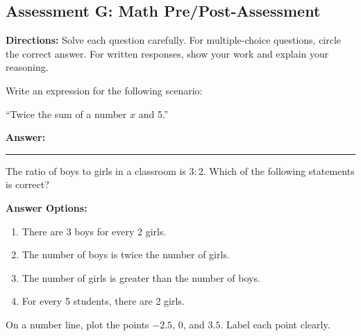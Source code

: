 \documentclass[12pt]{article}
\begin{document}
\subsection*{Assessment G: Math Pre/Post-Assessment}
\onehalfspacing

\begin{tcolorbox}[colframe=black!50, colback=white, title=Assessment Directions]
\textbf{Directions:} Solve each question carefully. For multiple-choice questions, circle the correct answer. For written responses, show your work and explain your reasoning.
\end{tcolorbox}

\begin{tcolorbox}[colframe=black!50, colback=white, title=\textbf{Problem 1 (6.EE.A.2)}]
Write an expression for the following scenario: 

``Twice the sum of a number \(x\) and 5.'' 

\vspace{2cm}
\textbf{Answer:} \rule{0.5\textwidth}{0.4mm}
\end{tcolorbox}

\begin{tcolorbox}[colframe=black!50, colback=white, title=\textbf{Problem 2 (6.RP.A.1)}]
The ratio of boys to girls in a classroom is \(3:2\). Which of the following statements is correct?

\textbf{Answer Options:}
\begin{enumerate}[label=(\Alph*), itemsep=0.5cm]
    \item There are 3 boys for every 2 girls.
    \item The number of boys is twice the number of girls.
    \item The number of girls is greater than the number of boys.
    \item For every 5 students, there are 2 girls.
\end{enumerate}
\vspace{1cm}
\end{tcolorbox}

\begin{tcolorbox}[colframe=black!50, colback=white, title=\textbf{Problem 3 (6.NS.C.6)}]
On a number line, plot the points \(-2.5\), \(0\), and \(3.5\). Label each point clearly.

\begin{center}
\end{center}
\vspace{1cm}
\end{tcolorbox}
\end{document}
